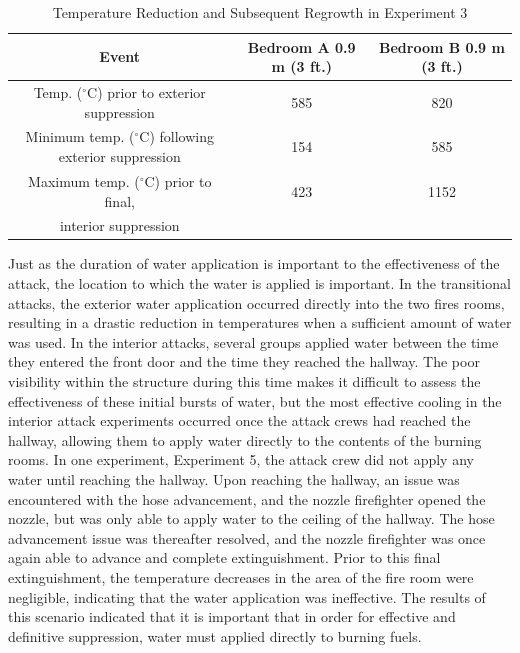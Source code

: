 \documentclass[12pt,oneside]{article}
\begin{document}
\begin{table}[!ht]
    \centering
    \caption{Temperature Reduction and Subsequent Regrowth in Experiment 3}
    \label{tab:exp_3_temps}
    \begin{tabular}{ccc}
    \toprule[1.5pt]
 	 Event 																	&	Bedroom A 0.9 m (3 ft.) &	Bedroom B 0.9 m (3 ft.) \\
 	\midrule 
  	Temp. ($^{\circ}$C) prior to exterior suppression 				&	585						&	820						\\
  	Minimum temp. ($^{\circ}$C) following exterior suppression		&	154						&	585						\\
  	Maximum temp. ($^{\circ}$C) prior to final,	&	423						&	1152						\\
  	 interior suppression						&							&								\\
 	\bottomrule[1.25pt] 
    \end{tabular}
\end{table}

Just as the duration of water application is important to the effectiveness of the attack, the location to which the water is applied is important. In the transitional attacks, the exterior water application occurred directly into the two fires rooms, resulting in a drastic reduction in temperatures when a sufficient amount of water was used. In the interior attacks, several groups applied water between the time they entered the front door and the time they reached the hallway. The poor visibility within the structure during this time makes it difficult to assess the effectiveness of these initial bursts of water, but the most effective cooling in the interior attack experiments occurred once the attack crews had reached the hallway, allowing them to apply water directly to the contents of the burning rooms. In one experiment, Experiment 5, the attack crew did not apply any water until reaching the hallway. Upon reaching the hallway, an issue was encountered with the hose advancement, and the nozzle firefighter opened the nozzle, but was only able to apply water to the ceiling of the hallway. The hose advancement issue was thereafter resolved, and the nozzle firefighter was once again able to advance and complete extinguishment. Prior to this final extinguishment, the temperature decreases in the area of the fire room were negligible, indicating that the water application was ineffective. The results of this scenario indicated that it is important that in order for effective  and definitive suppression, water must applied directly to burning fuels.
\end{document}
